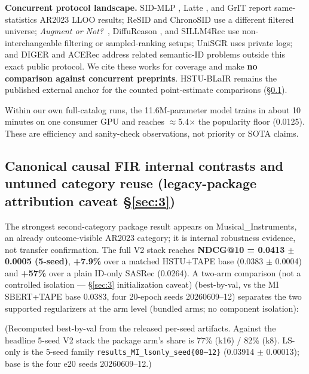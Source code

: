 \textbf{Concurrent protocol landscape.} SID-MLP \citep[arXiv:2605.12617]{guo2026sidmlp}, Latte \citep[arXiv:2605.06331]{hou2026latte}, and GrIT \citep[arXiv:2602.19728]{shyam2026grit} report same-statistics AR2023 LLOO results; ReSID \citep[arXiv:2602.02338]{liang2026resid} and ChronoSID \citep[arXiv:2607.03918]{huang2026chronosid} use a different filtered universe; \emph{Augment or Not?}~\citep[arXiv:2505.23053]{huang2025augment}, DiffuReason \citep[arXiv:2602.09744]{jiang2026diffureason}, and SILLM4Rec \citep[MMAsia 2025]{wu2025sillm4rec} use non-interchangeable filtering or sampled-ranking setups; UniSGR \citep[arXiv:2607.04068]{sun2026unisgr} uses private logs; and DIGER \citep[arXiv:2601.19711]{fu2026diger} and ACERec \citep[arXiv:2602.13573]{xia2026acerec} address related semantic-ID problems outside this exact public protocol. We cite these works for coverage and make \textbf{no comparison against concurrent preprints}. HSTU-BLaIR remains the published external anchor for the counted point-estimate comparisons (\S\ref{sec:5.2}).

Within our own full-catalog runs, the 11.6M-parameter model trains in about 10 minutes on one consumer GPU and reaches \ensuremath{\approx}5.4\ensuremath{\times} the popularity floor (0.0125). These are efficiency and sanity-check observations, not priority or SOTA claims.

\fi


\subsection{Canonical causal FIR internal contrasts and untuned category reuse (legacy-package attribution caveat \S\ref{sec:3})}\label{sec:5.2}

The strongest second-category package result appears on Musical\_Instruments, an already outcome-visible AR2023 category; it is internal robustness evidence, not transfer confirmation. The full V2 stack reaches \textbf{NDCG@10 = 0.0413 \ensuremath{\pm} 0.0005 (5-seed)}, \textbf{+7.9\%} over a matched HSTU+TAPE base (0.0383 \ensuremath{\pm} 0.0004) and \textbf{+57\%} over a plain ID-only SASRec (0.0264). A two-arm comparison (not a controlled isolation --- \S\ref{sec:3} initialization caveat) (best-by-val, vs the MI SBERT+TAPE base 0.0383, four 20-epoch seeds 20260609--12) separates the two supported regularizers at the arm level (bundled arms; no component isolation):



(Recomputed best-by-val from the released per-seed artifacts. Against the headline 5-seed V2 stack the package arm's share is 77\% (k16) / 82\% (k8). LS-only is the 5-seed family \texttt{results\_MI\_lsonly\_seed\{08–12\}} (0.03914 \ensuremath{\pm} 0.00013); base is the four e20 seeds 20260609--12.)

